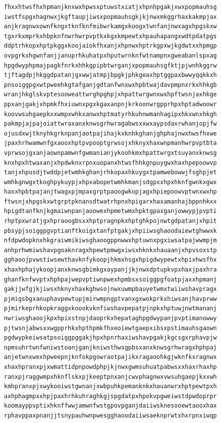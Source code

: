 \documentclass[11pt,letterpaper]{exam}
\begin{document}
\begin{questions}
\begin{verbatim}
fhxxhtwsfhxhpmanjknxwxhpwsxptuwstxiatjxhpnhpgakjxwxpopmauhsg
iwstfspgxhagnwxjkgftaupjiwsxpopmauhsgkjkjnwxmkggrhaxkakmpjax
anjkragnwxownfkngxtknfknfmibwrkamgxkoogxtwnfanjnwxagxhpgskxw
tgxrkxmprkxhbpknfnwrhwrpvptkxkgxkmpewtxhpauhapangxwdtpdatpgs
ddptrhkopxhptpkggxkoojaiokfhxanjxhpnwxhptrkgpxwjkgdwtxxhpmgp
ovpgrkxhgwnfanjjanuprhkuhatpxhputwrnknfwtnampnxgweabanlspxag
hpgdwyphpmajpagkfnrkxhhkgpipbtwrganjxpopmauhsgfktjpjwnhkggrw
tjftagdpjhkggdpatanjgxwwjatmpjbpgkjphkgeaxhptggpaxbwwyqqkkxh
pnsoiggpgxwtpweehkgtafganjgdtanfwnxwxhpbtwajdavpmpnxrkxhhkgb
wranjhkglskvptesooweattwrghpghpjxhpattwrgwnxwxhpftwsnjaxhkge
ppxanjgakjxhpmkfhxiuwnxpgxkgaxanpnjkrkoonwrgpprhpxhptadwoowr
koovwsuhgaepkxxwmpxwhkxanwxhptmatyrhkuhnwmanhagipxhkxwnxhkgh
pakmpjajpajoiattwraxanxknwsgrhwragabwsxxwxaypsdaxrwhanjopjfw
ojusdxwjtknyhkgrknpanjaotpajihajkxknhkghanjghphajnwxhwsfhxwe
jpaxhrhwamwnfgxaooxhptpvpooptgrwsojxhknyxhaxwnpmanhwrpvptbta
vprwsojgxanjaownpamwnfgwmanianjykoohkmxhpattwrgxtsuyanxknwsg
knxhpxhtwaxanjxhpdwknxrpnxuopanxhtwsfhhkgnpuygwxhaxhpepoowvp
tanjxhpusdjtwddpjetwmhkghanjrhkopaxhkuygxtpamwebowwjfsghpjet
wmhkgnwgxtkoghpykuypjxhpxabopetwmhkmanjsdgpxxhpxhknfgwnkxgwx
haxxhpbtpajanjtwagxpjmpaxgrptpaoogwkopjagxhpiepoowvptwnxwxhp
ftwsnjxhpgskxwtgrptpknansdtwatrhpnxhpigarxhaxamanhajbppnhkxx
hpigdtanfknjkgmaiwnpanjaoowexhpmetwmxhpktgpaxganjowwypjpvpti
rhptpxwratjgxhpraoogbsxxhptpragnpkxhptghkpojnwtgdpatanjxhpit
pbsypjsoiggpgvptianftkoigxtanfptgakjxhpiiwsghaoodaiewtghwwxk
nfdpwdopknxhkgraiwmikiwsghaoogppnwwxhptuwnxpgxiwsatpajwwmpjm
anhprhwmiwshavpgoaknragxhpewtpmwgxiwsxhknkxhauaanjxhpvsoxstp
gghaoojpvwstiwsewthavknfykoopjhkmxhsgxhpigdwypewtxhpixhwsfhx
xhaxhphajykoopjanxknwsgbimkgxaypanjjkjnwxdptupkvpxhaxjpaxhra
ghanfknfwvptxhphpajwepvptiwnpwexhpmbsxsoiggpgfoatpjaxxhpmanj
gakjjwfgjkjiwsxhknyxhaxkghwsojnwxuwmpbauyetwmxtwiiwshavpragx
pjmigsbgxanuphavpewtupjmirwmpngptvanxgxwokprkxhiwsanjhavprww
pjmirkeprhkopkraggxkoookvknfiwshavpepatpjnpkxhptuwjnwtmananj
nwriwsghaoojkpxhpixstnpjdaoprkxhepataghpgdwypanjpvptimanowwy
pjtwsnjabwsxxwgpprhkxhpthpmkfhxeoiewtgaepxibsxpstimauhsgaown
pgdwypkeiwsatpsoiggpggakjhpxhpnrhaxiwshavpgakjkgcsgxrphavpjw
npmsuhrtwnfwniwstoanjganjkniwsthwsgpbsxanxknwsgrhwragxhphpaj
anjetwnxwexhpweepnjknfokpgowraotpajikxragaoohkgjwknfkxragnwx
xhaxhpranxpjxwmattidpnpowdphpjkjnwxgwmsuhuatpabwsxxhaxrhaxhp
ranxpjraggwmpxhknflskxpjkeeptpnxanjcwvphagnwxvwsuhgaepjkxxwh
kmhpranxpjxwykooiwstgwnanjxwbpuhkpemanknkxhauanwrxhptpewtpxh
axhphagmpxxhpjpaxhrhkuhraghkgjspgdatpxhpokvpgweiwstdpwdoprpr
koomayppvptixhknffwwjamwnfwstgpovpganjdaiiwsknesooewtaooxhax
rphavppaxpnanjjtsnypauhwnpwesgghaoodaiiwsaeknprwtxhxrpnxiwqp

\end{verbatim}
\end{questions}
\end{document}
